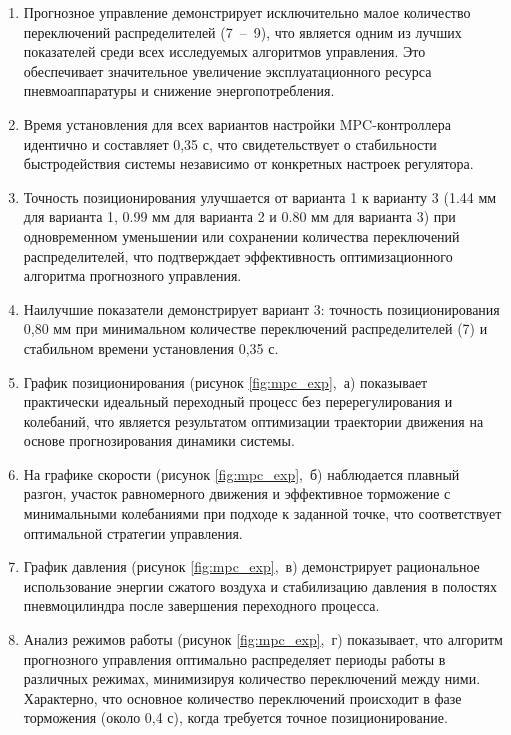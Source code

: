 \begin{enumerate}
	\item Прогнозное управление демонстрирует исключительно малое количество переключений
	      распределителей (7~--~9), что является одним из лучших показателей среди всех исследуемых алгоритмов управления.
	      Это обеспечивает значительное увеличение эксплуатационного ресурса пневмоаппаратуры и снижение энергопотребления.

	\item Время установления для всех вариантов настройки MPC-контроллера идентично и составляет
	      0,35 с, что свидетельствует о стабильности быстродействия системы независимо от конкретных настроек регулятора.

      \item Точность позиционирования улучшается от варианта 1 к варианту 3 (\num{1,44} мм для варианта 1, \num{0,99} мм для варианта 2 и \num{0,80} мм для варианта 3) при одновременном
	      уменьшении или сохранении количества переключений распределителей, что подтверждает эффективность оптимизационного алгоритма прогнозного управления.

	\item Наилучшие показатели демонстрирует вариант 3: точность позиционирования 0,80 мм при
	      минимальном количестве переключений распределителей (7) и стабильном времени установления 0,35 с.

	\item График позиционирования (рисунок \ref{fig:mpc_exp},~а) показывает практически идеальный переходный
	      процесс без перерегулирования и колебаний, что является результатом оптимизации траектории движения на основе прогнозирования динамики системы.

	\item На графике скорости (рисунок \ref{fig:mpc_exp},~б) наблюдается плавный разгон, участок равномерного движения и
	      эффективное торможение с минимальными колебаниями при подходе к заданной точке, что соответствует оптимальной стратегии управления.

	\item График давления (рисунок \ref{fig:mpc_exp},~в) демонстрирует рациональное использование энергии сжатого
	      воздуха и стабилизацию давления в полостях пневмоцилиндра после завершения переходного процесса.

	\item Анализ режимов работы (рисунок \ref{fig:mpc_exp},~г) показывает, что алгоритм прогнозного управления оптимально
	      распределяет периоды работы в различных режимах, минимизируя количество переключений между ними. Характерно, что
	      основное количество переключений происходит в фазе торможения (около 0,4 с), когда требуется точное позиционирование.
\end{enumerate}

